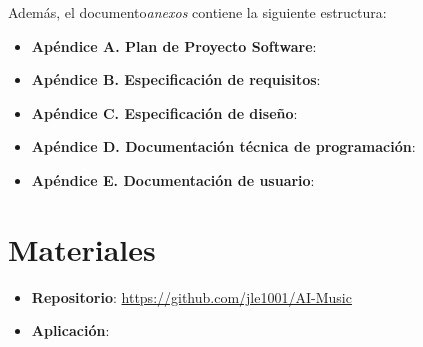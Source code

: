 Además, el documento\textit{anexos} contiene la siguiente estructura:

\begin{itemize}
\tightlist
\item \textbf{Apéndice A. Plan de Proyecto Software}:
\item \textbf{Apéndice B. Especificación de requisitos}:
\item \textbf{Apéndice C. Especificación de diseño}:
\item \textbf{Apéndice D. Documentación técnica de programación}:
\item \textbf{Apéndice E. Documentación de usuario}:
\end{itemize}

\section{Materiales}

\begin{itemize}
\tightlist
\item \textbf{Repositorio}: \url{https://github.com/jle1001/AI-Music}
\item \textbf{Aplicación}:
\end{itemize}